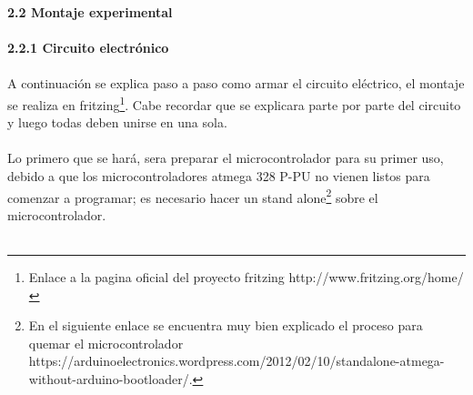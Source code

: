 \documentclass[12]{article}
\begin{document}
\begin{multicols}{2}
{\bf{2.2 Montaje experimental}}\\\\
{\bf{2.2.1 Circuito electrónico}}\\\\
A continuación se explica paso a paso como armar el circuito eléctrico, el montaje se realiza en fritzing\footnote{Enlace a la pagina oficial del proyecto fritzing http://www.fritzing.org/home/}. Cabe recordar que se explicara parte por parte del circuito y luego todas deben unirse en una sola.\\\\
Lo primero que se hará, sera preparar el microcontrolador para su primer uso, debido a que los microcontroladores atmega 328 P-PU no vienen listos para comenzar a programar; es necesario hacer un stand alone\footnote{En el siguiente enlace se encuentra muy bien explicado el proceso para quemar el microcontrolador https://arduinoelectronics.wordpress.com/2012/02/10/standalone-atmega-without-arduino-bootloader/.} sobre el microcontrolador.\\\\



\end{multicols}
\end{document}
